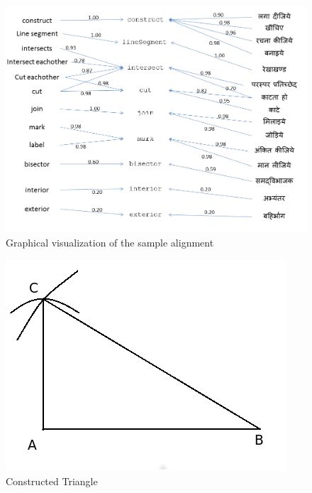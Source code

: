 \def\DevnagVersion{2.15}\documentclass[12pt]{article}
\begin{document}
\begin{figure}[H]
  \begin{center}
    \includegraphics[scale=0.5]{image.png}
  \end{center}
  \caption{Graphical visualization of the sample alignment}
  \label{fig:pspic}
\end{figure}

\begin{figure}[H]
  \begin{center}
    \includegraphics[scale=0.5]{triangle.png}
  \end{center}
  \caption{Constructed Triangle}
  \label{fig:pspic}
\end{figure}
\end{document}
